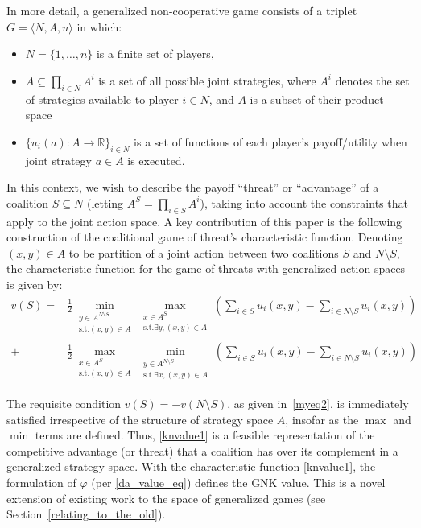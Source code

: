 In more detail, a generalized non-cooperative game consists of a triplet $G = \langle N,A,u \rangle$ in which:
\begin{itemize}
\item	$N=\{1,\dots,n\}$ is a finite set of players,
\item	$A\subseteq \prod_{i\in N}A^i$ is a set of all possible joint strategies, where $A^i$ denotes the set of strategies available to player $i\in N$, and $A$ is a subset of their product space
\item	$\{u_i(a) : A\rightarrow \mathbb{R}\}_{i\in N}$ is a set of functions of each player's payoff/utility when joint strategy $a\in A$ is executed.
\end{itemize}

In this context, we wish to describe the payoff ``threat'' or ``advantage'' of a coalition $S\subseteq N$ (letting $A^S=\prod_{i\in S}A^i$), taking into account the constraints that apply to the joint action space.  
A key contribution of this paper is the following construction of the coalitional game of threat's characteristic function. 
Denoting $(x,y)\in A$ to be partition of a joint action between two coalitions $S$ and $N\setminus S$, 
the characteristic function for the game of threats with generalized action spaces is given by:
\begin{align}
\label{knvalue1}
v(S) = &
\frac{1}{2}\min_{\substack{y\in A^{N\setminus S} \\ \text{s.t.}(x,y)\in A}} 
\max_{\substack{x\in A^S \\ \text{s.t.}\exists y,(x,y)\in A}}
	\left(\sum_{i\in S} u_i(x,y) - \sum_{i\in N\setminus S}u_i(x,y)\right)\nonumber\\
+&
\frac{1}{2}\max_{\substack{x\in A^S \\ \text{s.t.}(x,y)\in A}} 
\min_{\substack{y\in A^{N\setminus S} \\ \text{s.t.}\exists x,(x,y)\in A}}
	\left(\sum_{i\in S} u_i(x,y) - \sum_{i\in N\setminus S} u_i(x,y) \right)
\end{align}

The requisite condition $v(S)=-v(N\setminus S)$, as given in~\eqref{myeq2}, is immediately satisfied irrespective of the structure of strategy space $A$, insofar as the $\max$ and $\min$ terms are defined.
Thus, \eqref{knvalue1} is a feasible representation of the competitive advantage (or threat) that a coalition has over its complement in a generalized strategy space.
With the characteristic function \eqref{knvalue1}, the formulation of $\varphi$ (per \eqref{da_value_eq}) defines the GNK value.
This is a novel extension of existing work to the space of generalized games (see Section~\ref{relating_to_the_old}).

